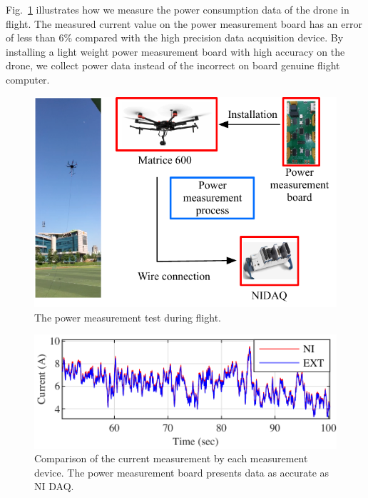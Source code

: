 \documentclass[journal]{./template/IEEEtran}
\begin{document}
Fig.~\ref{fig:flight_test} illustrates how we measure the power consumption data of the drone in flight.
The measured current value on the power measurement board has an error of less than 6\% compared with the high precision data acquisition device. By installing a light weight power measurement board with high accuracy on the drone, we collect power data instead of the incorrect on board genuine flight computer.

\begin{figure}[ht]
\centering
\includegraphics[scale=0.80]{fig3/flight_experiment.pdf}
\caption{The power measurement test during flight.}
\label{fig:flight_test}
\end{figure}

\begin{figure}[ht]
\centering
\includegraphics[scale=1.0]{fig4/flight_exp_result.pdf}
\caption{Comparison of the current measurement by each measurement device. The power measurement board presents data as accurate as NI DAQ.}
\end{figure}
\label{Section: Design the power measurement board}
\end{document}
